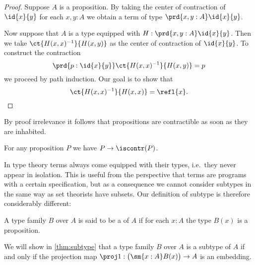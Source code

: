 \begin{proof}
Suppose $A$ is a proposition. By taking the center of contraction of $\id{x}{y}$ for each $x,y:A$ we obtain a term of type $\prd{x,y:A}\id{x}{y}$.

Now suppose that $A$ is a type equipped with $H:\prd{x,y:A}\id{x}{y}$. Then we take $\ct{H(x,x)^{-1}}{H(x,y)}$ as the center of contraction of $\id{x}{y}$. To construct the contraction
\begin{equation*}
\prd{p:\id{x}{y}} \ct{H(x,x)^{-1}}{H(x,y)}=p
\end{equation*}
we proceed by path induction. Our goal is to show that
\begin{equation*}
\ct{H(x,x)^{-1}}{H(x,x)}=\refl{x}.\qedhere
\end{equation*}
\end{proof}

By proof irrelevance it follows that propositions are contractible as soon as they are inhabited.

\begin{cor}\label{cor:contr_prop}
For any proposition $P$ we have $P\to\iscontr(P)$.
\end{cor}

In type theory terms always come equipped with their types, i.e.~they never appear in isolation. This is useful from the perspective that terms are programs with a certain specification, but as a consequence we cannot consider subtypes in the same way as set theorists have subsets. Our definition of subtype is therefore considerably different:

\begin{defn}
A type family $B$ over $A$ is said to be a  of $A$ if for each $x:A$ the type $B(x)$ is a proposition.
\end{defn}

We will show in \cref{thm:subtype} that a type family $B$ over $A$ is a subtype of $A$ if and only if the projection map $\proj 1:\big(\sm{x:A}B(x)\big)\to A$ is an embedding.

